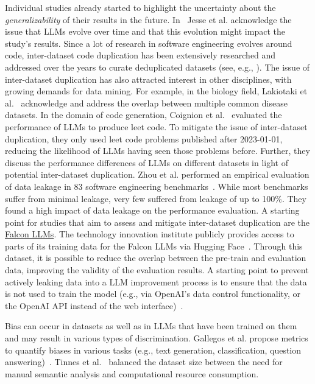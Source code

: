 Individual studies already started to highlight the uncertainty about the \emph{generalizability} of their results in the future. In~\cite{DBLP:conf/msr/JesseADM23} Jesse et al. acknowledge the issue that LLMs evolve over time and that this evolution might impact the study's results.
Since a lot of research in software engineering evolves around code, inter-dataset code duplication has been extensively researched and addressed over the years to curate deduplicated datasets (see, e.g., \cite{DBLP:journals/pacmpl/LopesMMSYZSV17, DBLP:conf/oopsla/Allamanis19, DBLP:journals/ese/KarmakarAR23, DBLP:journals/tse/LopezCSSV25}).
The issue of inter-dataset duplication has also attracted interest in other disciplines, with growing demands for data mining.
For example, in the biology field, Lakiotaki et al.~\cite{DBLP:journals/biodb/LakiotakiVTGT18} acknowledge and address the overlap between multiple common disease datasets. 
In the domain of code generation, Coignion et al.~\cite{DBLP:conf/ease/CoignionQR24} evaluated the performance of LLMs to produce leet code.
To mitigate the issue of inter-dataset duplication, they only used leet code problems published after 2023-01-01, reducing the likelihood of LLMs having seen those problems before. Further, they discuss the performance differences of LLMs on different datasets in light of potential inter-dataset duplication.
Zhou et al. performed an empirical evaluation of data leakage in 83 software engineering benchmarks~\cite{zhou2025lessleakbenchinvestigationdataleakage}.
While most benchmarks suffer from minimal leakage, very few suffered from leakage of up to 100\%. They found a high impact of data leakage on the performance evaluation.
A starting point for studies that aim to assess and mitigate inter-dataset duplication are the \href{https://huggingface.co/datasets/tiiuae/falcon-refinedweb}{Falcon LLMs}.
The technology innovation institute publicly provides access to parts of its training data for the Falcon LLMs via Hugging Face~\cite{technology_innovation_institute_2023}.
Through this dataset, it is possible to reduce the overlap between the pre-train and evaluation data, improving the validity of the evaluation results.
A starting point to prevent actively leaking data into a LLM improvement process is to ensure that the data is not used to train the model (e.g., via OpenAI's data control functionality, or the OpenAI API instead of the web interface)~\cite{DBLP:conf/eacl/BalloccuSLD24}.

Bias can occur in datasets as well as in LLMs that have been trained on them and may result in various types of discrimination.
Gallegos et al. propose metrics to quantify biases in various tasks (e.g., text generation, classification, question answering)~\cite{DBLP:journals/corr/abs-2309-00770}.
Tinnes et al.~\cite{tinnessoftware} balanced the dataset size between the need for manual semantic analysis and computational resource consumption.


